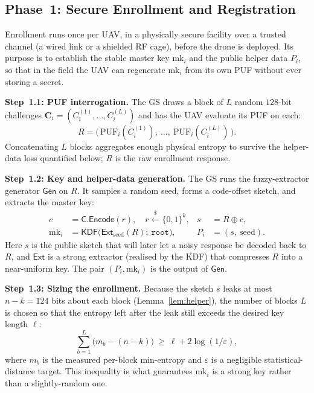 \documentclass[11pt,a4paper]{article}
\begin{document}
\subsection{Phase~1: Secure Enrollment and Registration}
\label{subsec:phase1}

Enrollment runs once per UAV, in a physically secure facility over a trusted
channel (a wired link or a shielded RF cage), before the drone is deployed. Its
purpose is to establish the stable master key $\text{mk}_i$ and the public
helper data $P_i$, so that in the field the UAV can regenerate $\text{mk}_i$
from its own PUF without ever storing a secret.

\textbf{Step~1.1: PUF interrogation.}
The GS draws a block of $L$ random $128$-bit challenges
$\bm{C}_i=(C_i^{(1)},\dots,C_i^{(L)})$ and has the UAV evaluate its PUF on each:
\begin{equation}
R = \big(\,\text{PUF}_i(C_i^{(1)}),\ \dots,\ \text{PUF}_i(C_i^{(L)})\,\big).
\end{equation}
Concatenating $L$ blocks aggregates enough physical entropy to survive the
helper-data loss quantified below; $R$ is the raw enrollment response.

\textbf{Step~1.2: Key and helper-data generation.}
The GS runs the fuzzy-extractor generator $\mathsf{Gen}$ on $R$. It samples a
random seed, forms a code-offset sketch, and extracts the master key:
\begin{align}
c &= \mathsf{C}.\mathsf{Encode}(r), \quad r \xleftarrow{\$} \{0,1\}^{k}, &
s &= R \oplus c, \\[1ex]
\text{mk}_i &= \mathsf{KDF}\big(\mathsf{Ext}_{\text{seed}}(R);\ \texttt{root}\big), &
P_i &= (s,\ \text{seed}).
\end{align}
Here $s$ is the public sketch that will later let a noisy response be decoded
back to $R$, and $\mathsf{Ext}$ is a strong extractor (realised by the KDF) that
compresses $R$ into a near-uniform key. The pair $(P_i,\text{mk}_i)$ is the
output of $\mathsf{Gen}$.

\textbf{Step~1.3: Sizing the enrollment.}
Because the sketch $s$ leaks at most $n-k=124$ bits about each block
(Lemma~\ref{lem:helper}), the number of blocks $L$ is chosen so that the
entropy left after the leak still exceeds the desired key length $\ell$:
\begin{equation}
\sum_{b=1}^{L}\big(m_b-(n-k)\big)\ \ge\ \ell + 2\log(1/\varepsilon),
\label{eq:budget}
\end{equation}
where $m_b$ is the measured per-block min-entropy and $\varepsilon$ is a
negligible statistical-distance target. This inequality is what guarantees
$\text{mk}_i$ is a strong key rather than a slightly-random one.
\end{document}

